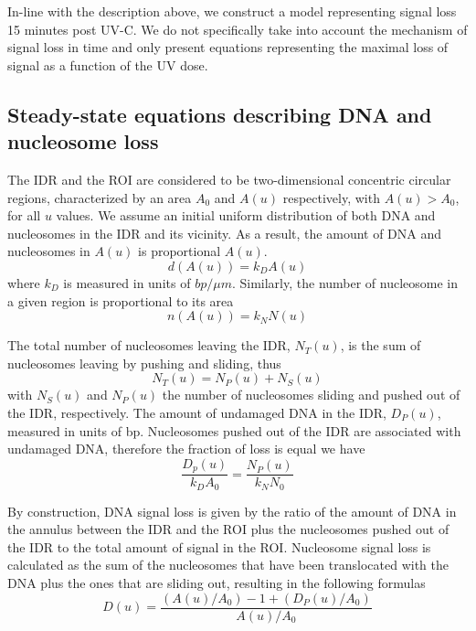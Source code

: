 \documentclass[12pt]{article}
\begin{document}
    In-line with the description above, we construct a model representing
	signal loss 15 minutes post UV-C. We do not specifically take into account the
	mechanism of signal loss in time and only present equations representing the maximal loss of signal as a function of the UV dose.
	
	\subsection{Steady-state equations describing DNA and nucleosome loss}
	The IDR and the ROI are considered to be two-dimensional concentric circular regions, characterized by an area $A_0$ and $A(u)$ respectively,
	with $A(u)> A_0$, for all $u$ values. We assume an initial uniform distribution of both DNA and nucleosomes in the IDR and its vicinity. As a result, the amount of DNA and nucleosomes in $A(u)$ is proportional $A(u)$. 
	\begin{equation*}
	d(A(u))= k_DA(u)
	\end{equation*}
	where $k_D$ is measured in units of $bp/\mu m$. Similarly, the number of nucleosome in a given region is proportional to its area
	\begin{equation*}
	n(A(u))=k_NN(u)
	\end{equation*}
	
	The total number of nucleosomes leaving the IDR, $N_T(u)$, is the sum of nucleosomes leaving by pushing and sliding, thus 
	\begin{equation*}
	N_T(u) = N_P(u) + N_S(u)
	\end{equation*}
	with $N_S(u)$ and $N_P(u)$ the number of nucleosomes sliding and pushed out
	of the IDR, respectively. The amount of undamaged DNA in the IDR, $D_P(u)$, measured in units of bp.   
	Nucleosomes pushed out of the IDR are associated
	with undamaged DNA, therefore the fraction of loss is equal we have 
	\begin{equation*}
	\frac{D_p(u)}{k_DA_0} = \frac{N_P(u)}{k_NN_0}
	\end{equation*} 
		
	By construction, DNA signal loss is given by the ratio of the amount of
	DNA in the annulus between the IDR and the ROI plus the nucleosomes
	pushed out of the IDR to the total amount of signal in the ROI. Nucleosome signal loss is calculated as the sum of the nucleosomes that have been
	translocated with the DNA plus the ones that are sliding out, resulting in
	the following formulas
	\begin{equation}\label{eq:DNAstst}
	D(u) = \frac{(A(u)/A_0)-1 + (D_P(u)/A_0)}{A(u)/A_0}	
	\end{equation}
	
\end{document}
